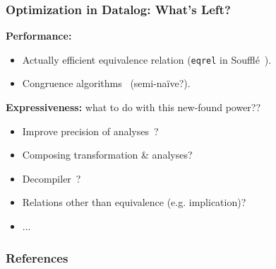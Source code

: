 \documentclass{beamer}
\begin{document}
\begin{frame}
    \frametitle{Optimization in Datalog: What's Left?}
    \textbf{Performance:}
    \begin{itemize}
        \item Actually efficient equivalence relation (\texttt{eqrel} in Souffl\'e~\cite{NappaZSS19}).
        \item Congruence algorithms~\cite{WillseyNWFTP21} (semi-na\"ive?).
    \end{itemize}
    \pause
    \textbf{Expressiveness:} what to do with this new-found power??
    \begin{itemize}
        \item Improve precision of analyses~\cite{Steensgaard96}?
        \item Composing transformation \& analyses\cite{LernerGC02}?
        \item Decompiler~\cite{GrechBSS19}?
        \item Relations other than equivalence (e.g. implication)?
        \item ...
    \end{itemize}
\end{frame}

\begin{frame}[allowframebreaks]
    \frametitle{References}
    
    
\end{frame}
\end{document}
